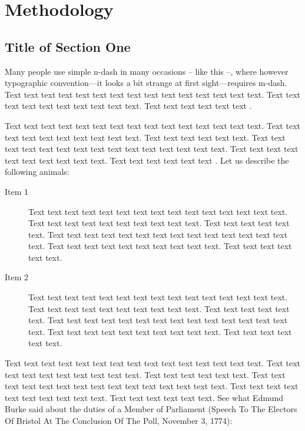 \chapter{Methodology}
\label{chap:four}

\section{Title of Section One}

Many people use simple n-dash in many occasions -- like this --, where however typographic convention---it looks a bit strange at first sight---requires m-dash. Text text text text text text text text text text text text text text text. Text text text text text text text text text text. Text text text text text text \citet{Haufler2006}. 

Text text text text text text text text text text text text text text text. Text text text text text text text text text text. Text text text text text text. Text text text text text text text text text text text text text text text. Text text text text text text text text text text. Text text text text text text \citet{Wells2001}. Let us describe the following animals:

\begin{description}
\item[Item 1] Text text text text text text text text text text text text text text text. Text text text text text text text text text text. Text text text text text text. Text text text text text text text text text text text text text text text. Text text text text text text text text text text. Text text text text text text.
\item[Item 2] Text text text text text text text text text text text text text text text. Text text text text text text text text text text. Text text text text text text. Text text text text text text text text text text text text text text text. Text text text text text text text text text text. Text text text text text text.
\end{description}

Text text text text text text text text text text text text text text text. Text text text text text text text text text text. Text text text text text text. Text text text text text text text text text text text text text text text. Text text text text text text text text text text. Text text text text text text. See what Edmund Burke said about the duties of a Member of Parliament (Speech To The Electors Of Bristol At The Conclusion Of The Poll, November 3, 1774):

